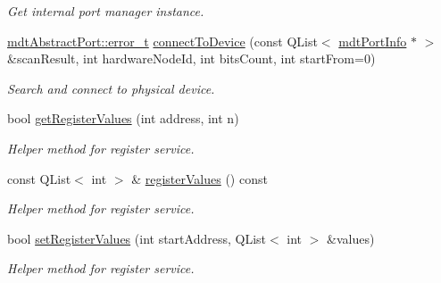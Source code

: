 \begin{DoxyCompactItemize}
\begin{DoxyCompactList}\small\item\em Get internal port manager instance. \end{DoxyCompactList}\item 
\hyperlink{classmdt_abstract_port_ad4121bb930c95887e77f8bafa065a85e}{mdtAbstractPort::error\_\-t} \hyperlink{classmdt_device_modbus_a323b16687f448a4e45eb0b313635b77f}{connectToDevice} (const QList$<$ \hyperlink{classmdt_port_info}{mdtPortInfo} $\ast$ $>$ \&scanResult, int hardwareNodeId, int bitsCount, int startFrom=0)
\begin{DoxyCompactList}\small\item\em Search and connect to physical device. \end{DoxyCompactList}\item 
bool \hyperlink{classmdt_device_modbus_a89d41c6b33a3dd2a92a0956d8e6b3b14}{getRegisterValues} (int address, int n)
\begin{DoxyCompactList}\small\item\em Helper method for register service. \end{DoxyCompactList}\item 
const QList$<$ int $>$ \& \hyperlink{classmdt_device_modbus_a83cb2a28111653fbcbbe748f7a1a2e3d}{registerValues} () const 
\begin{DoxyCompactList}\small\item\em Helper method for register service. \end{DoxyCompactList}\item 
bool \hyperlink{classmdt_device_modbus_a4128420bde679c3666bdf8954a221a53}{setRegisterValues} (int startAddress, QList$<$ int $>$ \&values)
\begin{DoxyCompactList}\small\item\em Helper method for register service. \end{DoxyCompactList}\end{DoxyCompactItemize}

